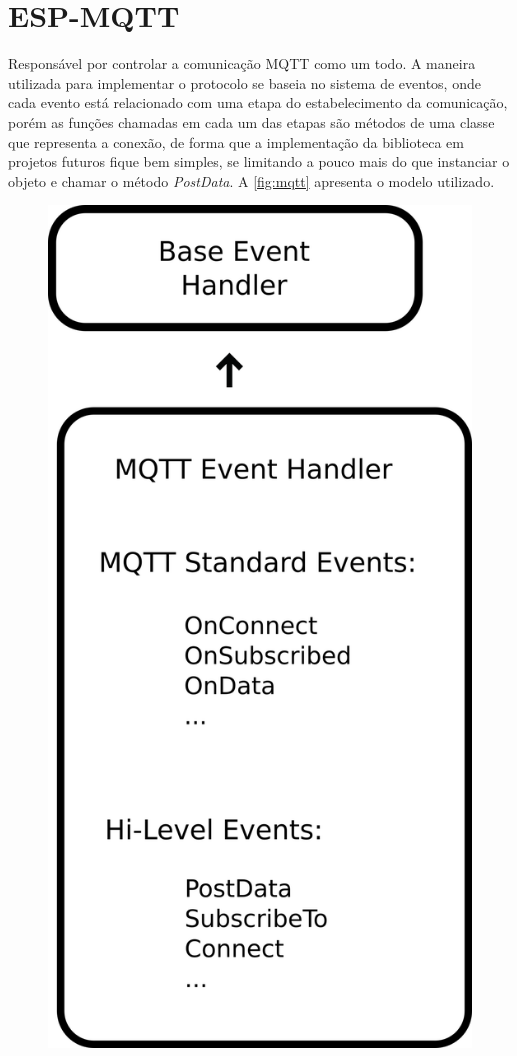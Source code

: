 \section{ESP-MQTT}

Responsável por controlar a comunicação \ac{MQTT} como um todo. A maneira utilizada para implementar o protocolo se 
baseia no sistema de eventos, onde cada evento está relacionado com uma etapa do estabelecimento da comunicação, 
porém as funções chamadas em cada um das etapas são métodos de uma classe que representa a conexão, de forma que 
a implementação da biblioteca em projetos futuros fique bem simples, se limitando a pouco mais do que instanciar o 
objeto e chamar o método \textit{PostData}. A \autoref{fig:mqtt} apresenta o modelo utilizado.

\begin{figure}[htb]
    \begin{center}
	    \includegraphics[scale=0.5]{figs/mqtt-dia.png}

\end{center}
\end{figure}
